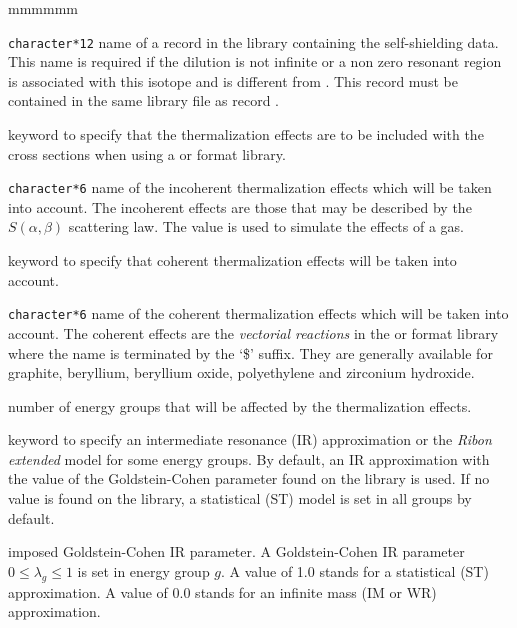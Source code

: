\begin{ListeDeDescription}{mmmmmm}
\item[\dusa{NAMS}] {\tt character*12} name of a record in the library
containing the self-shielding data. This name is required if the dilution is
not infinite or a non zero resonant region is associated with this isotope and 
is different from . This record must be contained in the same
library file as record .

\item[\moc{THER}] keyword to specify that the thermalization effects are to be
included with the cross sections when using a  or  format
library.

\item[\dusa{HINC}] {\tt character*6} name  of the incoherent thermalization
effects which will be taken into account. The incoherent effects are those that
may be described by the $S(\alpha,\beta)$ scattering law. The value 
is used to simulate the effects of a gas.

\item[\moc{TCOH}]  keyword to specify that coherent thermalization effects
will be taken into account.

\item[\dusa{HCOH}] {\tt character*6} name of the coherent thermalization
effects which will be taken into account. The coherent effects are the
{\sl vectorial reactions} in the  or  format library where
the name is terminated by the `\$' suffix. They are generally available for
graphite, beryllium, beryllium oxide, polyethylene and zirconium hydroxide.

\item[\dusa{ntfg}]  number of energy groups that will be affected by the
thermalization effects.

\item[\moc{IRSET}] keyword to specify an intermediate resonance (IR)
approximation or the {\sl Ribon extended} model for some energy groups. By default, an
IR approximation with the value of the Goldstein-Cohen parameter found on the library
is used. If no value is found on the library, a statistical (ST) model\cite{st} is set in
all groups by default.

\item[\dusa{gir}]  imposed Goldstein-Cohen IR parameter. A Goldstein-Cohen IR parameter
$0 \le \lambda_g\le 1$ is set in energy group $g$. A value of 1.0 stands for
a statistical (ST) approximation. A value of 0.0 stands for an infinite mass
(IM or WR) approximation.


\end{ListeDeDescription}
